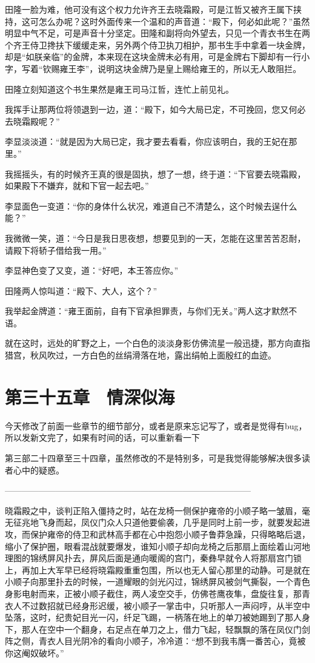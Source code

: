 田隆一脸为难，他可没有这个权力允许齐王去晓霜殿，可是江哲又被齐王属下挟持，这可怎么办呢？这时外面传来一个温和的声音道：“殿下，何必如此呢？”虽然明显中气不足，可是声音十分坚定。田隆和副将向外望去，只见一个青衣书生在两个齐王侍卫搀扶下缓缓走来，另外两个侍卫执刀相护，那书生手中拿着一块金牌，却是“如朕亲临”的金牌，本来现在这块金牌未必有用，可是金牌右下脚却有一行小字，写着“钦赐雍王李”，说明这块金牌乃是皇上赐给雍王的，所以无人敢阻拦。

田隆立刻知道这个书生果然是雍王司马江哲，连忙上前见礼。

我挥手让那两位将领退到一边，道：“殿下，如今大局已定，不可挽回，您又何必去晓霜殿呢？”

李显淡淡道：“就是因为大局已定，我才要去看看，你应该明白，我的王妃在那里。”

我摇摇头，有的时候齐王真的很是固执，想了一想，终于道：“下官要去晓霜殿，如果殿下不嫌弃，就和下官一起去吧。”

李显面色一变道：“你的身体什么状况，难道自己不清楚么，这个时候去逞什么能？”

我微微一笑，道：“今日是我日思夜想，想要见到的一天，怎能在这里苦苦忍耐，请殿下将轿子借给我一用。”

李显神色变了又变，道：“好吧，本王答应你。”

田隆两人惊叫道：“殿下、大人，这个？”

我举起金牌道：“雍王面前，自有下官承担罪责，与你们无关。”两人这才默然不语。

就在这时，远处的旷野之上，一个白色的淡淡身影仿佛流星一般迅捷，那方向直指猎宫，秋风吹过，一方白色的丝绢滑落在地，露出绢帕上面殷红的血迹。

\chapter{第三十五章　情深似海}

今天修改了前面一些章节的细节部分，或者是原来忘记写了，或者是觉得有bug，所以发新文完了，如果有时间的话，可以重新看一下

第三部二十四章至三十四章，虽然修改的不是特别多，可是我觉得能够解决很多读者心中的疑惑。

—————————————————————————————

晓霜殿之中，谈判正陷入僵持之时，站在龙椅一侧保护雍帝的小顺子略一皱眉，毫无征兆地飞身而起，凤仪门众人只道他要偷袭，几乎是同时上前一步，就要发起进攻，而保护雍帝的侍卫和武林高手都在心中抱怨小顺子鲁莽急躁，只得略略后退，缩小了保护圈，眼看混战就要爆发，谁知小顺子却向龙椅之后那扇上面绘着山河地理图的锦绣屏风扑去，屏风后面是通向暖阁的宫门，秦彝早就令人将那扇宫门锁上，再加上大军早已经将晓霜殿重重包围，所以也无人留心那里的动静。可是就在小顺子向那里扑去的时候，一道耀眼的剑光闪过，锦绣屏风被剑气撕裂，一个青色身影电射而来，正被小顺子截住，两人凌空交手，仿佛苍鹰夜隼，盘旋往复，那青衣人不过数招就已经身形迟缓，被小顺子一掌击中，只听那人一声闷哼，从半空中坠落，这时，纪贵妃目光一闪，纤足飞踢，一柄落在地上的单刀被她踢到了那人身下，那人在空中一个翻身，右足点在单刀之上，借力飞起，轻飘飘的落在凤仪门剑阵之侧，青衣人目光阴冷的看向小顺子，冷冷道：“想不到我韦膺一番苦心，竟被你这阉奴破坏。”


